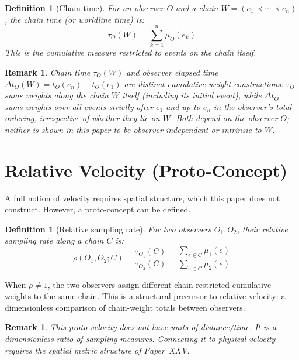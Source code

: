 \documentclass[12pt]{article}
\newtheorem{definition}[theorem]{Definition}
\newtheorem{remark}[theorem]{Remark}
\begin{document}
\begin{definition}[Chain time]\label{def:chaintime}
For an observer $O$ and a chain $W = (e_1 \prec \cdots \prec e_n)$, the \textit{chain time} (or worldline time) is:
\begin{equation}
    \tau_O(W) = \sum_{k=1}^{n} \mu_O(e_k)
\end{equation}
This is the cumulative measure restricted to events on the chain itself.
\end{definition}

\begin{remark}
Chain time $\tau_O(W)$ and observer elapsed time $\Delta t_O(W) = t_O(e_n) - t_O(e_1)$ are distinct cumulative-weight constructions: $\tau_O$ sums weights along the chain $W$ itself (including its initial event), while $\Delta t_O$ sums weights over all events strictly after $e_1$ and up to $e_n$ in the observer's total ordering, irrespective of whether they lie on $W$. Both depend on the observer $O$; neither is shown in this paper to be observer-independent or intrinsic to $W$.
\end{remark}

\section{Relative Velocity (Proto-Concept)}\label{sec:velocity}

A full notion of velocity requires spatial structure, which this paper does not construct. However, a proto-concept can be defined.

\begin{definition}[Relative sampling rate]\label{def:velocity}
For two observers $O_1, O_2$, their \textit{relative sampling rate} along a chain $C$ is:
\begin{equation}
    \rho(O_1, O_2; C) = \frac{\tau_{O_1}(C)}{\tau_{O_2}(C)} = \frac{\sum_{e \in C} \mu_1(e)}{\sum_{e \in C} \mu_2(e)}
\end{equation}
\end{definition}

When $\rho \neq 1$, the two observers assign different chain-restricted cumulative weights to the same chain. This is a structural precursor to relative velocity: a dimensionless comparison of chain-weight totals between observers.

\begin{remark}
This proto-velocity does not have units of distance/time. It is a dimensionless ratio of sampling measures. Connecting it to physical velocity requires the spatial metric structure of Paper~XXV.
\end{remark}
\end{document}
